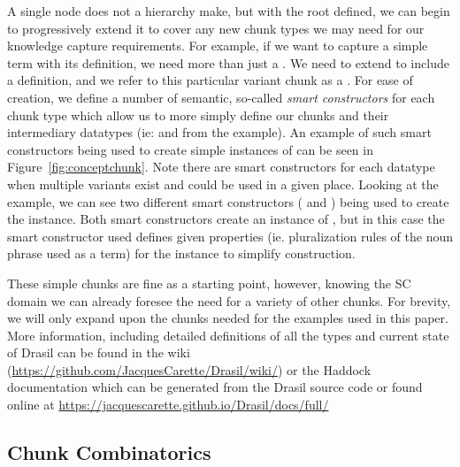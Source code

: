 A single node does not a hierarchy make, but with the root  
defined, we can begin to progressively extend it to cover any new chunk types 
we may need for our knowledge capture requirements. For example, if we want to 
capture a simple term with its definition, we need more than just a 
. We need to extend  to include a 
definition, and we refer to this particular variant chunk as a 
. For ease of creation, we define a number of semantic, 
so-called \emph{smart constructors} for each chunk type which allow us to more 
simply define our chunks and their intermediary datatypes (ie:  and 
 from the  example). An example of such smart 
constructors being used to create simple instances of  can 
be seen in Figure~\ref{fig:conceptchunk}. Note there are smart constructors 
for each datatype when multiple variants exist and could be used in a given 
place. Looking at the  example, we can see two different 
smart constructors ( and ) being used to create the 
 instance. Both smart constructors create an instance of , 
but in this case the smart constructor used defines given properties (ie. 
pluralization rules of the noun phrase used as a term) for the instance to 
simplify construction.


These simple chunks are fine as a starting point, however, knowing the SC 
domain we can already foresee the need for a variety of other chunks. For 
brevity, we will only expand upon the chunks needed for the examples used in 
this paper. More information, including detailed definitions of all the types 
and current state of Drasil can be found in the wiki 
(\href{https://github.com/JacquesCarette/Drasil/wiki/}
{https://github.com/JacquesCarette/Drasil/wiki/}) or the Haddock documentation 
which can be generated from the Drasil source code or found online at 
\href{https://jacquescarette.github.io/Drasil/docs/full/}
{https://jacquescarette.github.io/Drasil/docs/full/}

\subsection{Chunk Combinatorics}
\label{sec:chunky}

